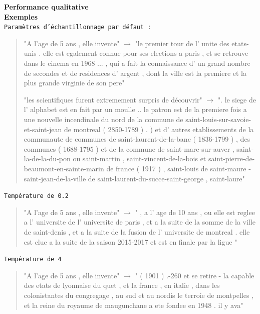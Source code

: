 \noindent{}\textbf{Performance qualitative} \\

\textbf{Exemples} \\

\noindent{} \texttt{Paramètres d'échantillonnage par défaut :}

\begin{quotation}
"A l'age de 5 ans , elle invente" $\rightarrow$ "le premier tour de l' unite des etats-unis . elle est egalement connue pour ses elections a paris , et se retrouve dans le cinema en 1968 ... , qui a fait la connaissance d' un grand nombre de secondes et de residences d' argent , dont la ville est la premiere et la plus grande virginie de son pere"


"les scientifiques furent extremement surpris de découvrir" $\rightarrow$ ". le siege de l' alphabet est en fait par un moulle .. le patron est de la premiere fois a une nouvelle incendinale du nord de la commune de saint-louis-sur-savoie-et-saint-jean de montreal ( 2850-1789 ) . ) et d' autres etablissements de la communaute de communes de saint-laurent-de-la-banc ( 1836-1799 ) , des communes ( 1688-1795 ) et de la commune de saint-marc-sur-auver , saint-la-de-la-du-pon ou saint-martin , saint-vincent-de-la-bois et saint-pierre-de-beaumont-en-sainte-marin de france ( 1917 ) , saint-louis de saint-maure - saint-jean-de-la-ville de saint-laurent-du-succe-saint-george , saint-laure"
\end{quotation}

\noindent{} \texttt{Température de 0.2}

\begin{quotation}
"A l'age de 5 ans , elle invente" $\rightarrow$ " , a l' age de 10 ans , ou elle est reglee a l' universite de l' universite de paris , et a la suite de la somme de la ville de saint-denis , et a la suite de la fusion de l' universite de montreal . elle est elue a la suite de la saison 2015-2017 et est en finale par la ligue "
\end{quotation}

\noindent{} \texttt{Température de 4}

\begin{quotation}
"A l'age de 5 ans , elle invente" $\rightarrow$ " ( 1901 ) .-260 et se retire - la capable des etats de lyonnaise du quet , et la france , en italie , dans les colonistantes du congregage , au sud et au nordis le terroie de montpelles , et la reine du royaume de maugunchane a ete fondee en 1948 . il y ava"
\end{quotation}

